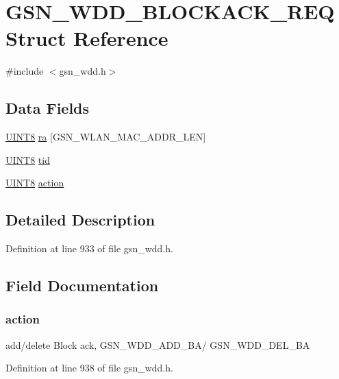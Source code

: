 \hypertarget{a00272}{
\section{GSN\_\-WDD\_\-BLOCKACK\_\-REQ Struct Reference}
\label{a00272}
}


{\ttfamily \#include $<$gsn\_\-wdd.h$>$}

\subsection*{Data Fields}
\begin{DoxyCompactItemize}
\item 
\hyperlink{a00660_gab27e9918b538ce9d8ca692479b375b6a}{UINT8} \hyperlink{a00272_a1d97eb2e070b4a95218b41f6abbff9d7}{ra} \mbox{[}GSN\_\-WLAN\_\-MAC\_\-ADDR\_\-LEN\mbox{]}
\item 
\hyperlink{a00660_gab27e9918b538ce9d8ca692479b375b6a}{UINT8} \hyperlink{a00272_abf69ed815c8482f9995e41bc0aff9043}{tid}
\item 
\hyperlink{a00660_gab27e9918b538ce9d8ca692479b375b6a}{UINT8} \hyperlink{a00272_ac1731c03e4e0dbe0c25f3a606a77df7e}{action}
\end{DoxyCompactItemize}


\subsection{Detailed Description}


Definition at line 933 of file gsn\_\-wdd.h.



\subsection{Field Documentation}
\hypertarget{a00272_ac1731c03e4e0dbe0c25f3a606a77df7e}{
\subsubsection[{action}]{ {\bf action}}}
\label{a00272_ac1731c03e4e0dbe0c25f3a606a77df7e}
add/delete Block ack, GSN\_\-WDD\_\-ADD\_\-BA/ GSN\_\-WDD\_\-DEL\_\-BA 

Definition at line 938 of file gsn\_\-wdd.h.

